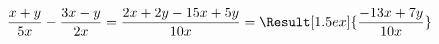 
$\dfrac{x+y}{5x}-\dfrac{3x-y}{2x} = \dfrac{2x+2y-15x+5y}{10x} = \Result[1.5ex]{\dfrac{-13x+7y}{10x}}$
